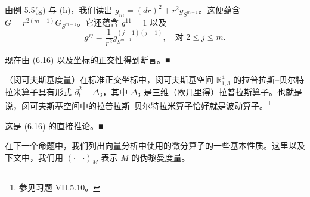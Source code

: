 \begin{example}
\begin{items}
\proofhead
由例 5.5(g) 与 (h)，我们读出 $ g_m = (dr)^{2} + r^{2}g_{S^{m-1}} $。这便蕴含 $ G = r^{2(m-1)}G_{S^{m-1}} $。它还蕴含 $ g^{11} = 1 $ 以及
\[
g^{jj} = \frac{1}{r^{2}}g^{(j-1)(j-1)}_{S^{m-1}}, \quad \text{对 } 2 \le j \le m.
\]

现在由 (6.16) 以及坐标的正交性得到断言。\nobreak\hspace{0.35em}■

\item[（f）]

（闵可夫斯基度量）在标准正交坐标中，闵可夫斯基空间 $ \mathbb{R}^4_{1,3} $ 的拉普拉斯–贝尔特拉米算子具有形式 $ \partial_{t}^{2} - \Delta_{3} $，其中 $ \Delta_3 $ 是三维（欧几里得）拉普拉斯算子。也就是说，闵可夫斯基空间中的拉普拉斯–贝尔特拉米算子恰好就是波动算子。\footnote{参见习题 VII.5.10。}

\proofhead
这是 (6.16) 的直接推论。\nobreak\hspace{0.35em}■
\end{items}

在下一个命题中，我们列出向量分析中使用的微分算子的一些基本性质。这里以及下文中，我们用 $ (\cdot\mid\cdot)_M $ 表示 $ M $ 的伪黎曼度量。

\end{example}

